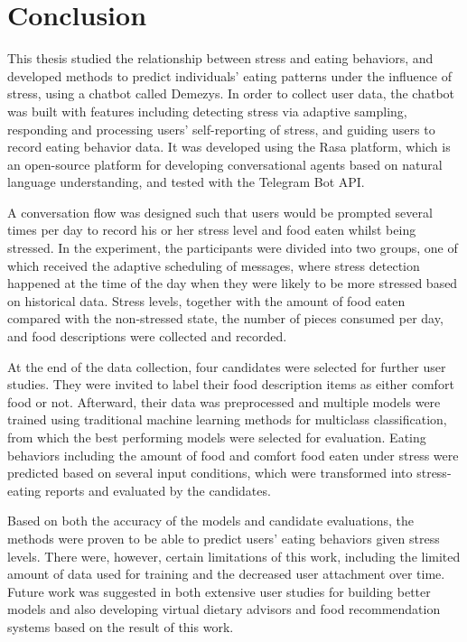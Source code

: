
\chapter{Conclusion}\label{chapter:conclusion}
This thesis studied the relationship between stress and eating behaviors, and developed methods to predict individuals' eating patterns under the influence of stress, using a chatbot called Demezys. In order to collect user data, the chatbot was built with features including detecting stress via adaptive sampling, responding and processing users' self-reporting of stress, and guiding users to record eating behavior data. It was developed using the Rasa platform, which is an open-source platform for developing conversational agents based on natural language understanding, and tested with the Telegram Bot API.

A conversation flow was designed such that users would be prompted several times per day to record his or her stress level and food eaten whilst being stressed. In the experiment, the participants were divided into two groups, one of which received the adaptive scheduling of messages, where stress detection happened at the time of the day when they were likely to be more stressed based on historical data. Stress levels, together with the amount of food eaten compared with the non-stressed state, the number of pieces consumed per day, and food descriptions were collected and recorded.

At the end of the data collection, four candidates were selected for further user studies. They were invited to label their food description items as either comfort food or not. Afterward, their data was preprocessed and multiple models were trained using traditional machine learning methods for multiclass classification, from which the best performing models were selected for evaluation. Eating behaviors including the amount of food and comfort food eaten under stress were predicted based on several input conditions, which were transformed into stress-eating reports and evaluated by the candidates.

Based on both the accuracy of the models and candidate evaluations, the methods were proven to be able to predict users' eating behaviors given stress levels. There were, however, certain limitations of this work, including the limited amount of data used for training and the decreased user attachment over time. Future work was suggested in both extensive user studies for building better models and also developing virtual dietary advisors and food recommendation systems based on the result of this work.
